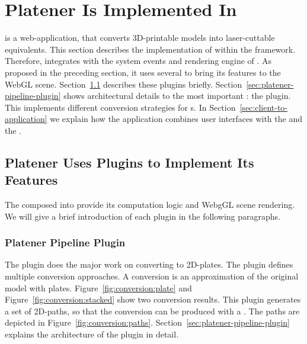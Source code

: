 \documentclass[../03-Architecture.tex]{subfiles}
\begin{document}
\section{Platener Is Implemented In {\convertify}}
\label{sec:application-platener}


{\platener} is a web-application, that converts 3D-printable
models into laser-cuttable equivalents. This section
describes the implementation of {\platener} within the
{\convertify} framework. Therefore, {\platener} integrates
with the system events and rendering engine of
{\convertify}. As proposed in the preceding section, it uses
several  to bring its features to the WebGL
scene. Section~\ref{sec:platener-uses-plugins} describes
these plugins briefly.
Section~\ref{sec:platener-pipeline-plugin} shows
architectural details to the most important :
the  plugin. This 
implements different conversion strategies for
{\threedmodel}s. In Section~\ref{sec:client-to-application}
we explain how the application combines user interfaces with
the  and the .

\subsection{Platener Uses Plugins to Implement Its Features}
\label{sec:platener-uses-plugins}

The  composed into {\platener} provide its
computation logic and WebgGL scene rendering. We will give a
brief introduction of each plugin in the following
paragraphs.

\subsubsection{Platener Pipeline Plugin}

The  plugin does the major work on
converting {\threedmodels} to 2D-plates. The plugin defines
multiple conversion approaches. A conversion is an
approximation of the original model with plates.
Figure~\ref{fig:conversion:plate} and
Figure~\ref{fig:conversion:stacked} show two conversion
results. This plugin generates a set of 2D-paths, so that
the conversion can be produced with a {\lasercutter}. The
paths are depicted in Figure~\ref{fig:conversion:paths}.
Section~\ref{sec:platener-pipeline-plugin} explains the
architecture of the  plugin in
detail.
\end{document}
